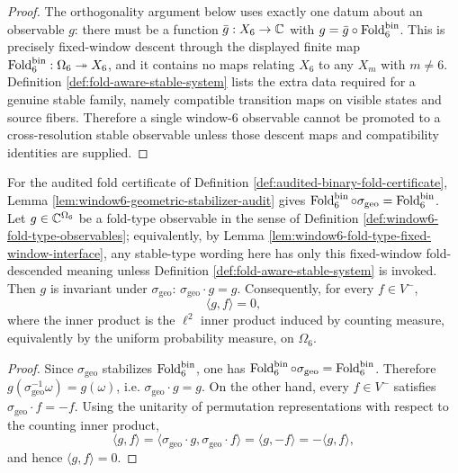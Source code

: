 \begin{proof}
The orthogonality argument below uses exactly one datum about an observable \(g\): there must be a function \(\bar g:X_6\to\mathbb{C}\) with \(g=\bar g\circ\operatorname{Fold}_6^{\mathrm{bin}}\).  This is precisely fixed-window descent through the displayed finite map \(\operatorname{Fold}_6^{\mathrm{bin}}:\Omega_6\twoheadrightarrow X_6\), and it contains no maps relating \(X_6\) to any \(X_m\) with \(m\ne6\).  Definition \ref{def:fold-aware-stable-system} lists the extra data required for a genuine stable family, namely compatible transition maps on visible states and source fibers.  Therefore a single window-\(6\) observable cannot be promoted to a cross-resolution stable observable unless those descent maps and compatibility identities are supplied. \qedhere
\end{proof}

\begin{proposition}\label{prop:window6-chiral-orthogonality-to-type-observables}
For the audited fold certificate of Definition \ref{def:audited-binary-fold-certificate}, Lemma \ref{lem:window6-geometric-stabilizer-audit} gives \(\operatorname{Fold}_6^{\mathrm{bin}}\circ \sigma_{\mathrm{geo}}=\operatorname{Fold}_6^{\mathrm{bin}}\).
Let \(g\in\mathbb{C}^{\Omega_6}\) be a fold-type observable in the sense of Definition \ref{def:window6-fold-type-observables}; equivalently, by Lemma \ref{lem:window6-fold-type-fixed-window-interface}, any stable-type wording here has only this fixed-window fold-descended meaning unless Definition \ref{def:fold-aware-stable-system} is invoked.
Then \(g\) is invariant under \(\sigma_{\mathrm{geo}}\):
\(
\sigma_{\mathrm{geo}}\cdot g=g
\).
Consequently, for every \(f\in V^-\),
\[
\langle g,f\rangle=0,
\]
where the inner product is the \(\ell^2\) inner product induced by counting measure, equivalently by the uniform probability measure, on \(\Omega_6\).
\end{proposition}
\begin{proof}
Since \(\sigma_{\mathrm{geo}}\) stabilizes \(\operatorname{Fold}_6^{\mathrm{bin}}\), one has \(\operatorname{Fold}_6^{\mathrm{bin}}\circ\sigma_{\mathrm{geo}}=\operatorname{Fold}_6^{\mathrm{bin}}\).
Therefore \(g(\sigma_{\mathrm{geo}}^{-1}\omega)=g(\omega)\), i.e. \(\sigma_{\mathrm{geo}}\cdot g=g\).
On the other hand, every \(f\in V^-\) satisfies \(\sigma_{\mathrm{geo}}\cdot f=-f\).
Using the unitarity of permutation representations with respect to the counting inner product,
\[
\langle g,f\rangle=\langle \sigma_{\mathrm{geo}}\cdot g,\sigma_{\mathrm{geo}}\cdot f\rangle=\langle g,-f\rangle=-\langle g,f\rangle,
\]
and hence \(\langle g,f\rangle=0\). \qedhere
\end{proof}
